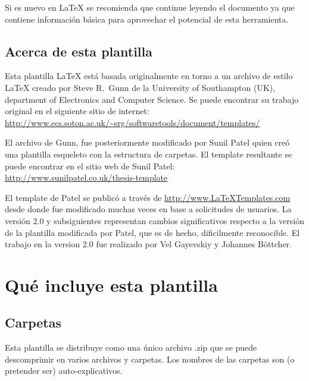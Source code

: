 Si es nuevo en \LaTeX{} se recomienda que continue leyendo el documento ya que contiene información básica para aprovechar el potencial de esta herramienta.


\subsection{Acerca de esta plantilla}

Esta plantilla \LaTeX{} está basada originalmente en torno a un archivo de estilo \LaTeX{} creado por Steve R.\ Gunn de la  University of Southampton (UK), department of Electronics and Computer Science. Se puede encontrar su trabajo original en el siguiente sitio de internet:
\url{http://www.ecs.soton.ac.uk/~srg/softwaretools/document/templates/}

El archivo de Gunn,  fue posteriormente modificado por Sunil Patel quien creó una plantilla esqueleto con la estructura de carpetas. El template resultante se puede encontrar en el sitio web de Sunil Patel:
\url{http://www.sunilpatel.co.uk/thesis-template}

El template de Patel se publicó a través de  \url{http://www.LaTeXTemplates.com} desde donde fue modificado muchas veces en base a solicitudes de usuarios. La versión 2.0 y subsiguientes representan cambios significativos respecto a la versión de la plantilla modificada por Patel, que es de hecho, dificilmente reconocible. El trabajo en la version 2.0 fue realizado por Vel Gayevskiy y Johannes Böttcher.



\section{Qué incluye esta plantilla}

\subsection{Carpetas}

Esta plantilla se distribuye como una único archivo .zip que se puede descomprimir en varios archivos y carpetas. Los nombres de las carpetas son (o pretender ser) auto-explicativos.


